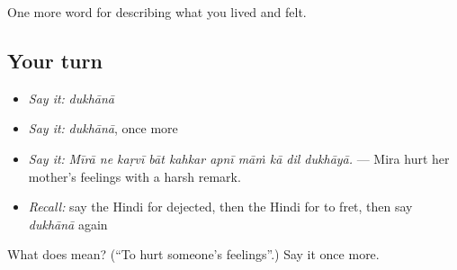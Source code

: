 \begin{grammarlens}[title={What you've built}]
One more word for describing what you lived and felt.
\end{grammarlens}

\subsection*{Your turn}
\begin{itemize}
\raggedright
  \item \emph{Say it:} \emph{dukhānā}
  \item \emph{Say it:} \emph{dukhānā}, once more
  \item \emph{Say it:} \emph{Mīrā ne kaṛvī bāt kahkar apnī māṁ kā dil dukhāyā.} — Mira hurt her mother's feelings with a harsh remark.
  \item \emph{Recall:} say the Hindi for dejected, then the Hindi for to fret, then say \emph{dukhānā} again
\end{itemize}

\begin{tcolorbox}[breakable,colback=teal!4,colframe=teal!35!black,title={Before you move on}]
What does  mean? (\textquotedblleft{}To hurt someone's feelings\textquotedblright{}.) Say it once more.
\end{tcolorbox}
